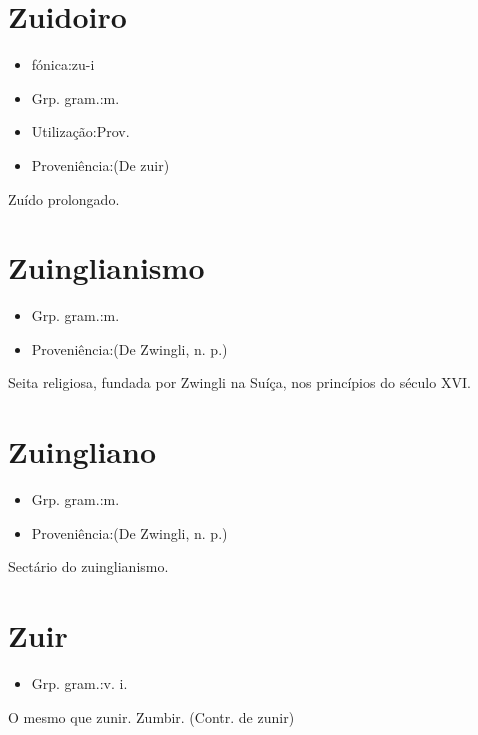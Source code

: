 \section{Zuidoiro}
\begin{itemize}
\item {fónica:zu-i}
\end{itemize}
\begin{itemize}
\item {Grp. gram.:m.}
\end{itemize}
\begin{itemize}
\item {Utilização:Prov.}
\end{itemize}
\begin{itemize}
\item {Proveniência:(De \textunderscore zuir\textunderscore )}
\end{itemize}
Zuído prolongado.
\section{Zuinglianismo}
\begin{itemize}
\item {Grp. gram.:m.}
\end{itemize}
\begin{itemize}
\item {Proveniência:(De \textunderscore Zwingli\textunderscore , n. p.)}
\end{itemize}
Seita religiosa, fundada por Zwingli na Suíça, nos princípios do século XVI.
\section{Zuingliano}
\begin{itemize}
\item {Grp. gram.:m.}
\end{itemize}
\begin{itemize}
\item {Proveniência:(De \textunderscore Zwingli\textunderscore , n. p.)}
\end{itemize}
Sectário do zuinglianismo.
\section{Zuir}
\begin{itemize}
\item {Grp. gram.:v. i.}
\end{itemize}
O mesmo que \textunderscore zunir\textunderscore .
Zumbir.
(Contr. de \textunderscore zunir\textunderscore )
